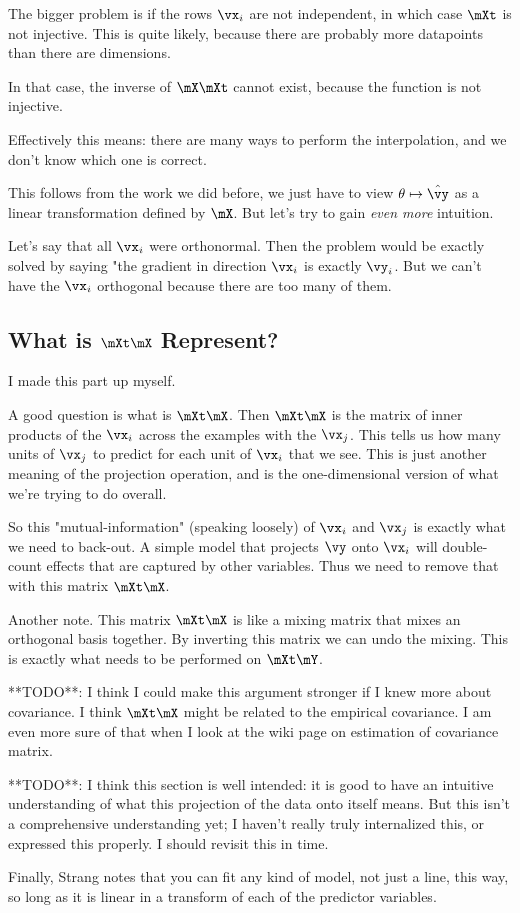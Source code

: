 The bigger problem is if the rows $\vx_i$ are not independent, in which
case $\mXt$ is not injective. This is quite likely, because there
are probably more datapoints than there are dimensions.

In that case, the inverse of $\mX \mXt$ cannot exist, because the
function is not injective.

Effectively this means: there are many ways to perform the
interpolation, and we don't know which one is correct.

This follows from the work we did before, we just have to view $\theta
\mapsto \hat{\vy}$ as a linear transformation defined by $\mX$. But
let's try to gain \emph{even more} intuition.

Let's say that all $\vx_i$ were orthonormal. Then the problem would be
exactly solved by saying "the gradient in direction $\vx_i$ is exactly
$\vy_i$. But we can't have the $\vx_i$ orthogonal because there are too
many of them.

\subsection{What is $\mXt \mX$ Represent?}

I made this part up myself.

A good question is what is $\mXt \mX$. Then $\mXt \mX$ is the matrix of
inner products of the $\vx_i$ across the examples with the $\vx_j$. This
tells us how many units of $\vx_j$ to predict for each unit of $\vx_i$
that we see. This is just another meaning of the projection operation,
and is the one-dimensional version of what we're trying to do overall.

So this "mutual-information" (speaking loosely) of $\vx_i$ and $\vx_j$
is exactly what we need to back-out. A simple model that projects $\vy$
onto $\vx_i$ will double-count effects that are captured by other
variables. Thus we need to remove that with this matrix $\mXt \mX$.

Another note. This matrix $\mXt \mX$ is like a mixing matrix that mixes
an orthogonal basis together. By inverting this matrix we can undo the
mixing. This is exactly what needs to be performed on $\mXt \mY$.

**TODO**: I think I could make this argument stronger if I knew more
about covariance. I think $\mXt \mX$ might be related to the empirical
covariance. I am even more sure of that when I look at the wiki page on
estimation of covariance matrix.

**TODO**: I think this section is well intended: it is good to have an
intuitive understanding of what this projection of the data onto
itself means. But this isn't a comprehensive understanding yet; I
haven't really truly internalized this, or expressed this properly. I
should revisit this in time.

Finally, Strang notes that you can fit any kind of model, not just a
line, this way, so long as it is linear in a transform of each of the
predictor variables.
